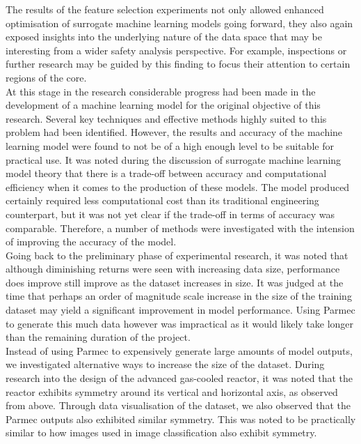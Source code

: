  \noindent
 The results of the feature selection experiments not only allowed enhanced optimisation of surrogate machine learning models going forward, they also again exposed insights into the underlying nature of the data space that may be interesting from a wider safety analysis perspective. For example, inspections or further research may be guided by this finding to focus their attention to certain regions of the core. \\
 
 \noindent 
At this stage in the research considerable progress had been made in the development of a machine learning model for the original objective of this research. Several key techniques and effective methods highly suited to this problem  had been identified. However, the results and accuracy of the machine learning model were found to not be of a high enough level to be suitable for practical use. It was noted during the discussion of surrogate machine learning model theory that there is a trade-off between accuracy and  computational efficiency when it comes to the production of these models. The model produced certainly required less computational cost than its traditional engineering counterpart, but it was not yet clear if the trade-off in terms of accuracy was comparable. Therefore, a number of methods were investigated with the intension of improving the accuracy of the model.\\

\noindent
Going back to the preliminary phase of experimental research, it was noted that although diminishing returns were seen with increasing data size, performance does improve still improve as the dataset increases in size. It was judged at the time that perhaps an order of magnitude scale increase in the size of the training dataset may yield a significant improvement in model  performance.  Using Parmec to generate this much data however was impractical as it would likely take longer than the remaining duration of the project. \\

\noindent Instead of using Parmec to expensively generate large amounts of model outputs, we investigated alternative ways to increase the size of the dataset. During research into the design of the advanced gas-cooled reactor, it was noted that the reactor exhibits symmetry around its vertical and horizontal axis, as observed from above. Through data visualisation of the dataset, we also observed that the Parmec outputs also exhibited similar symmetry. This was noted to be practically similar to how images used in image classification also exhibit symmetry.\\

